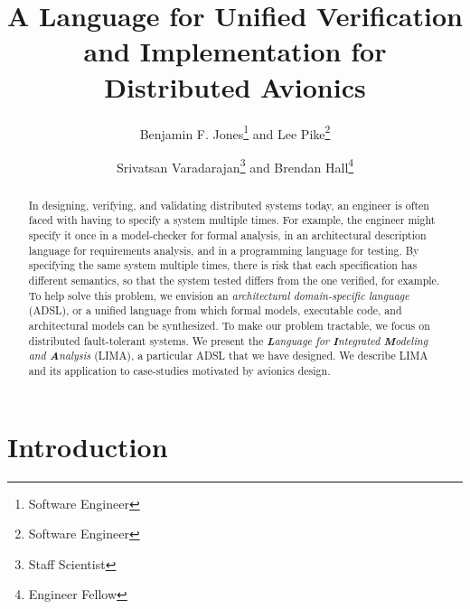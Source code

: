 \documentclass{AIAA_REVTeX41/AIAA}
\newcommand{\lee}[1]{ } %
\newcommand{\lee}[1]{ {\color{blue}$<$lee: #1$>$} } %
\begin{document}
\title{A Language for Unified Verification and Implementation for Distributed Avionics}

\author{Benjamin F. Jones\footnote{Software Engineer} and Lee Pike\footnote{Software Engineer}}
\author{Srivatsan Varadarajan\footnote{Staff Scientist} and Brendan Hall\footnote{Engineer Fellow}} 

\begin{abstract}
In designing, verifying, and validating distributed systems today, an engineer is often faced with having to specify a system multiple times. For example, the engineer might specify it once in a model-checker for formal analysis, in an architectural description language for requirements analysis, and in a programming language for testing. By specifying the same system multiple times, there is risk that each specification has different semantics, so that the system tested differs from the one verified, for example. To help solve this problem, we envision an \emph{architectural domain-specific language} (ADSL), or a unified language from which formal models, executable code, and architectural models can be synthesized. To make our problem tractable, we focus on distributed fault-tolerant systems. We present the \emph{\textbf{L}anguage for \textbf{I}ntegrated \textbf{M}odeling and \textbf{A}nalysis} (LIMA), a particular ADSL that we have designed. We describe LIMA and its application to case-studies motivated by avionics design.
\end{abstract}

\maketitle

\lee{%
TODOs:
\begin{itemize}
\item Change pounds to dollars in LIMA examples.
\end{itemize}
}

\section{Introduction}
\label{sec:problem}


\end{document}
